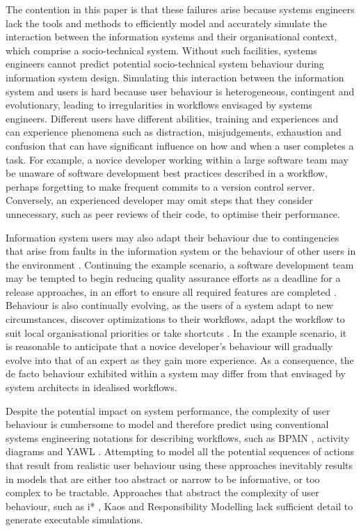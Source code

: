 \documentclass{llncs}
\begin{document}
The contention in this paper is that these failures arise because systems engineers lack the tools and methods to
efficiently model and accurately simulate the interaction between the information systems and their organisational
context, which comprise a socio-technical system. Without such facilities, systems engineers cannot predict potential
socio-technical system behaviour during information system design. Simulating this interaction between the information
system and users is hard because user behaviour is heterogeneous, contingent and evolutionary, leading to irregularities
in workflows envisaged by systems engineers.  Different users have different abilities, training and experiences and can
experience phenomena such as distraction, misjudgements, exhaustion and confusion that can have significant influence on
how and when a user completes a task.  For example, a novice developer working within a large software team may be
unaware of software development best practices described in a workflow, perhaps forgetting to make frequent commits to a
version control server.  Conversely, an experienced developer may omit steps that they consider unnecessary, such as
peer reviews of their code, to optimise their performance.

Information system users may also adapt their behaviour due to contingencies that arise from faults in the information
system or the behaviour of other users in the environment \citep{sommerville09deriving}.  Continuing the example
scenario, a software development team may be tempted to begin reducing quality assurance efforts as a deadline for a
release approaches, in an effort to ensure all required features are completed \citep{beck02test}. Behaviour is also
continually evolving, as the users of a system adapt to new circumstances, discover optimizations to their
workflows, adapt the workflow to suit local organisational priorities or take shortcuts \citep{bonen79evolutionary}.  In
the example scenario, it is reasonable to anticipate that a novice developer's behaviour will gradually evolve into that
of an expert as they gain more experience.  As a consequence, the de facto behaviour exhibited within a system may
differ from that envisaged by system architects in idealised workflows.

Despite the potential impact on system performance, the complexity of user behaviour is cumbersome to model and
therefore predict using conventional systems engineering notations for describing workflows, such as  BPMN
\citep{omg2011omgbpmn}, activity diagrams \citep{omg07omguml} and YAWL \citep{hofstede2010yawl}.
Attempting to model all the potential sequences of actions that result
from realistic user behaviour using these approaches inevitably results in models that are either too abstract or narrow
to be informative, or too complex to be tractable.  Approaches that abstract the complexity of user behaviour, such as
i* \citep{yu1995social}, Kaos \citep{werneck2009goreistarkaos} and Responsibility Modelling
\citep{sommerville09deriving} lack sufficient detail to generate executable simulations.
\end{document}
